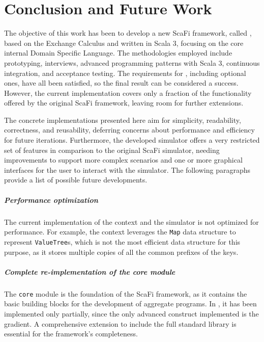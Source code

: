 \chapter{Conclusion and Future Work}
\label{chap:conclusion-and-future-work}

The objective of this work has been to develop a new ScaFi framework, called \this, based on the Exchange Calculus and written in Scala 3, focusing on the core internal Domain Specific Language.
%
The methodologies employed include prototyping, interviews, advanced programming patterns with Scala 3, continuous integration, and acceptance testing.
%
The requirements for \this, including optional ones, have all been satisfied, so the final result can be considered a success.
%
However, the current implementation covers only a fraction of the functionality offered by the original ScaFi framework, leaving room for further extensions.

The concrete implementations presented here aim for simplicity, readability, correctness, and reusability, deferring concerns about performance and efficiency for future iterations.
%
Furthermore, the developed simulator offers a very restricted set of features in comparison to the original ScaFi simulator, needing improvements to support more complex scenarios and one or more graphical interfaces for the user to interact with the simulator.
%
The following paragraphs provide a list of possible future developments.

\paragraph{Performance optimization} The current implementation of the context and the simulator is not optimized for performance.
%
For example, the context leverages the \texttt{Map} data structure to represent \texttt{ValueTree}s, which is not the most efficient data structure for this purpose, as it stores multiple copies of all the common prefixes of the keys.

\paragraph{Complete re-implementation of the core module} The \texttt{core} module is the foundation of the ScaFi framework, as it contains the basic building blocks for the development of aggregate programs.
%
In \this, it has been implemented only partially, since the only advanced construct implemented is the gradient.
%
A comprehensive extension to include the full standard library is essential for the framework's completeness.

